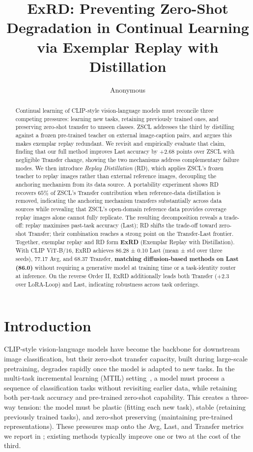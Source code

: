 \documentclass{article}
\title{ExRD: Preventing Zero-Shot Degradation in Continual Learning via Exemplar Replay with Distillation}
\author{Anonymous}
\let\cite\citep
\begin{document}
  \maketitle


  \begin{abstract}
  Continual learning of CLIP-style vision-language models must reconcile three competing pressures: learning new tasks, retaining previously trained ones, and preserving zero-shot transfer to unseen classes. ZSCL addresses the third by distilling against a frozen pre-trained teacher on external image-caption pairs, and argues this makes exemplar replay redundant. We revisit and empirically evaluate that claim, finding that our full method improves Last accuracy by $+2.68$ points over ZSCL with negligible Transfer change, showing the two mechanisms address complementary failure modes. We then introduce \emph{Replay Distillation}
  (RD), which applies ZSCL's frozen teacher to replay images rather than external reference images, decoupling the anchoring mechanism from its data source. A portability experiment shows RD recovers $65\%$ of ZSCL's Transfer contribution when reference-data distillation is removed, indicating the anchoring mechanism transfers substantially across data sources while revealing that ZSCL's open-domain reference data provides coverage replay images alone cannot fully replicate. The resulting decomposition reveals a trade-off: replay maximises past-task accuracy (Last); RD shifts the trade-off toward zero-shot Transfer; their combination reaches a strong point on the Transfer-Last frontier. Together, exemplar replay and RD form \textbf{ExRD} (Exemplar Replay with Distillation). With CLIP ViT-B/16, ExRD achieves 86.28 ± 0.10 Last (mean ± std over three seeds), 77.17 Avg, and 68.37 Transfer,\textbf{ matching diffusion-based methods on Last (86.0)} without requiring a generative model at training time or a task-identity router at inference. On the reverse Order II, ExRD additionally leads both Transfer (+2.3 over LoRA-Loop) and Last, indicating robustness across task orderings.
 
  \end{abstract}

  \section{Introduction}
  CLIP-style vision-language models have become the backbone for downstream image classification, but their zero-shot transfer capacity, built during large-scale pretraining, degrades rapidly once the model is adapted to new tasks. In the multi-task incremental learning (MTIL) setting~\cite{zheng2023zscl}, a model must process a sequence of classification tasks without revisiting earlier data, while
  retaining both per-task accuracy and pre-trained zero-shot capability. This creates a three-way tension: the model must be plastic (fitting each new task), stable (retaining previously trained tasks), and zero-shot preserving (maintaining pre-trained representations). These pressures map onto the Avg, Last, and Transfer metrics we report in ; existing methods typically improve
  one or two at the cost of the third. 
\end{document}
